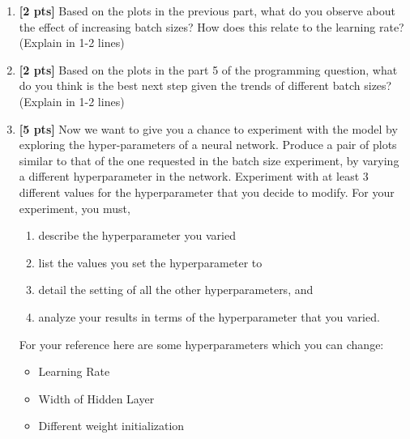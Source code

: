\begin{enumerate}
    \begin{tcolorbox}[fit,height=8cm, width=0.95\textwidth, blank, borderline={1pt}{-2pt}]
    \end{tcolorbox}

    
    \item \textbf{[2 pts]} Based on the plots in the previous part, what do you observe about the effect of increasing batch sizes? How does this relate to the learning rate? (Explain in 1-2 lines)

    \begin{tcolorbox}[fit,height=2cm, width=0.95\textwidth, blank, borderline={1pt}{-2pt}]
    \end{tcolorbox}
        
    
    \item \textbf{[2 pts]} Based on the plots in the part 5 of the programming question, what do you think is the best next step given the trends of different batch sizes? (Explain in 1-2 lines)

    \begin{tcolorbox}[fit,height=2cm, width=0.95\textwidth, blank, borderline={1pt}{-2pt}]
    \end{tcolorbox}
        
    \clearpage
    \item  \textbf{[5 pts]} Now we want to give you a chance to experiment with the model by exploring the hyper-parameters of a neural network. Produce a pair of plots similar to that of the one requested in the batch size experiment, by varying a different hyperparameter in the network. Experiment with at least 3 different values for the hyperparameter that you decide to modify. For your experiment, you must,

    \begin{enumerate}[label=(\alph*)]
        \item describe the hyperparameter you varied
        \item list the values you set the hyperparameter to
        \item detail the setting of all the other hyperparameters, and
        \item analyze your results in terms of the hyperparameter that you varied.
    \end{enumerate}
    
    For your reference here are some hyperparameters which you can change:
    \begin{itemize}
        \item Learning Rate
        \item Width of Hidden Layer
        \item Different weight initialization
    \end{itemize}


\end{enumerate}
